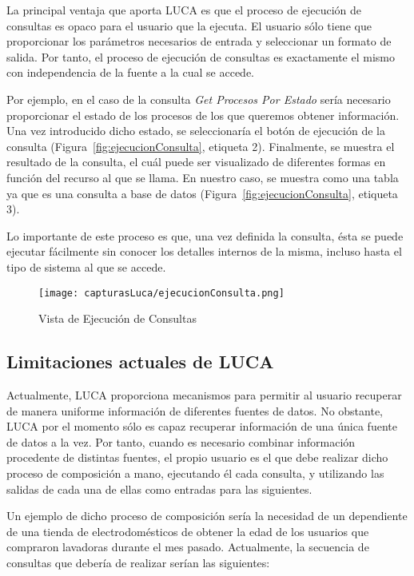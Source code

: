 La principal ventaja que aporta LUCA es que el proceso de ejecución de consultas es opaco para el usuario que la ejecuta. El usuario sólo tiene que proporcionar los parámetros necesarios de entrada y seleccionar un formato de salida. Por tanto, el proceso de ejecución de consultas es exactamente el mismo con independencia de la fuente a la cual se accede.

Por ejemplo, en el caso de la consulta \emph{Get Procesos Por Estado} sería necesario proporcionar el estado de los procesos de los que queremos obtener información. Una vez introducido dicho estado, se seleccionaría el botón de ejecución de la consulta (Figura~\ref{fig:ejecucionConsulta}, etiqueta 2). Finalmente, se muestra el resultado de la consulta, el cuál puede ser visualizado de diferentes formas en función del recurso al que se llama. En nuestro caso, se muestra como una tabla ya que es una consulta a base de datos (Figura~\ref{fig:ejecucionConsulta}, etiqueta 3).

Lo importante de este proceso es que, una vez definida la consulta, ésta se puede ejecutar fácilmente sin conocer los detalles internos de la misma, incluso hasta el tipo de sistema al que se accede.


	\begin{figure}[!tb]
		\centering
		\texttt{[image: capturasLuca/ejecucionConsulta.png]}
		\caption{Vista de Ejecución de Consultas}\label{fig:ejecucionConsultas}
	\end{figure}

\subsection{Limitaciones actuales de LUCA}

Actualmente, LUCA proporciona mecanismos para permitir al usuario recuperar de manera uniforme información de diferentes fuentes de datos. No obstante, LUCA por el momento sólo es capaz recuperar información de una única fuente de datos a la vez. Por tanto, cuando es necesario combinar información procedente de distintas fuentes, el propio usuario es el que debe realizar dicho proceso de composición a mano, ejecutando él cada consulta, y utilizando las salidas de cada una de ellas como entradas para las siguientes.


Un ejemplo de dicho proceso de composición sería la necesidad de un dependiente de una tienda de electrodomésticos de obtener la edad de los usuarios que compraron lavadoras durante el mes pasado. Actualmente, la secuencia de consultas que debería de realizar serían las siguientes:


